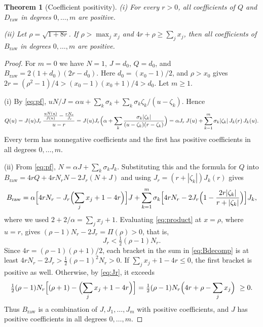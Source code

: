 \documentclass[11pt]{article}
\theoremstyle{plain}
\newtheorem{theorem}{Theorem}[section]
\theoremstyle{definition}
\theoremstyle{remark}
\numberwithin{equation}{section}
\newcommand{\raw}{\mathrm{raw}}
\begin{document}
\begin{theorem}[Coefficient positivity]\label{thm:positivity}
\textup{(i)} For every \(r>0\), all coefficients of \(Q\) and \(D_{\raw}\) in degrees
\(0,\dots,m\) are positive.

\textup{(ii)} Let \(\rho=\sqrt{1+8r}\). If \(\rho>\max_jx_j\) and
\(4r+\rho\ge\sum_jx_j\), then all coefficients of \(B_{\raw}\) in degrees \(0,\dots,m\) are
positive.
\end{theorem}
\begin{proof}
For \(m=0\) we have \(N=1\), \(J=d_0\), \(Q=d_0\), and \(B_{\raw}=2(1+d_0)(2r-d_0)\). Here
\(d_0=(x_0-1)/2\), and \(\rho>x_0\) gives \(2r=(\rho^2-1)/4>(x_0-1)(x_0+1)/4>d_0\). Let
\(m\ge1\).

(i) By \eqref{eq:pf}, \(uN/J=\alpha u+\sum_k\sigma_k+\sum_k\sigma_k\zeta_k/(u-\zeta_k)\). Hence
\[
 Q(u)=J(u)J_r\,\frac{\frac{uN(u)}{J(u)}-\frac{rN_r}{J_r}}{u-r}
 =J(u)J_r\Bigl(\alpha+\sum_k\frac{\sigma_k|\zeta_k|}{(u-\zeta_k)(r-\zeta_k)}\Bigr)
 =\alpha J_r\,J(u)+\sum_{k=1}^m\sigma_k|\zeta_k|\,J_k(r)\,J_k(u).
\]
Every term has nonnegative coefficients and the first has positive coefficients in all
degrees \(0,\dots,m\).

(ii) From \eqref{eq:pf}, \(N=\alpha J+\sum_k\sigma_kJ_k\). Substituting this and the formula
for \(Q\) into \(B_{\raw}=4rQ+4rN_rN-2J_r(N+J)\) and using \(J_r=(r+|\zeta_k|)J_k(r)\) gives
\begin{equation}\label{eq:Bdecomp}
 B_{\raw}=\alpha\Bigl[4rN_r-J_r\Bigl(\sum_jx_j+1-4r\Bigr)\Bigr]J
 +\sum_{k=1}^m\sigma_k\Bigl[4rN_r-2J_r\Bigl(1-\frac{2r|\zeta_k|}{r+|\zeta_k|}\Bigr)\Bigr]J_k ,
\end{equation}
where we used \(2+2/\alpha=\sum_jx_j+1\). Evaluating \eqref{eq:product} at \(x=\rho\), where
\(u=r\), gives \((\rho-1)N_r-2J_r=\Pi(\rho)>0\), that is,
\begin{equation}\label{eq:Jr}
 J_r<\tfrac12(\rho-1)N_r .
\end{equation}
Since \(4r=(\rho-1)(\rho+1)/2\), each bracket in the sum in \eqref{eq:Bdecomp} is at least
\(4rN_r-2J_r>\tfrac12(\rho-1)^2N_r>0\). If \(\sum_jx_j+1-4r\le0\), the first bracket is
positive as well. Otherwise, by \eqref{eq:Jr}, it exceeds
\[
 \tfrac12(\rho-1)N_r\Bigl[(\rho+1)-\Bigl(\sum_jx_j+1-4r\Bigr)\Bigr]
 =\tfrac12(\rho-1)N_r\Bigl(4r+\rho-\sum_jx_j\Bigr)\ \ge0 .
\]
Thus \(B_{\raw}\) is a combination of \(J,J_1,\dots,J_m\) with positive coefficients, and \(J\)
has positive coefficients in all degrees \(0,\dots,m\).
\end{proof}
\end{document}
